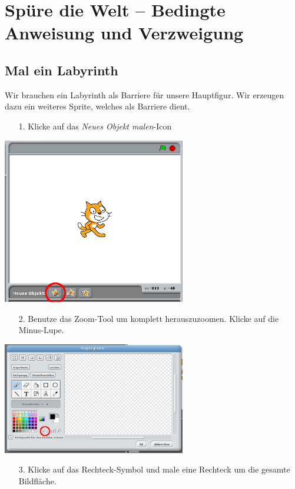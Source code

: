 \section{Spüre die Welt – Bedingte Anweisung und Verzweigung}

\subsection{Mal ein Labyrinth}

Wir brauchen ein Labyrinth als Barriere für unsere Hauptfigur. Wir erzeugen dazu ein weiteres Sprite, welches als Barriere dient.

\begin{itemize}
\item[1.] Klicke auf das \textit{Neues Objekt malen}-Icon 
\end{itemize}
\includegraphics[width=0.6\textwidth]{images/aufgabe2_neues_objekt_malen.png}
\begin{itemize}
\item[2.] Benutze das Zoom-Tool um komplett herauszuzoomen. Klicke auf die Minus-Lupe.
\end{itemize}
\includegraphics[width=0.6\textwidth]{images/aufgabe2_zoom.png}
\begin{itemize}
\item[3.] Klicke auf das Rechteck-Symbol und male eine Rechteck um die gesamte Bildfläche.
\end{itemize}
